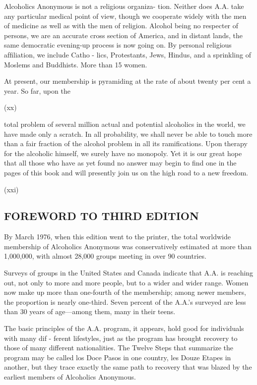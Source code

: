 Alcoholics Anonymous is not a religious organiza-
tion. Neither does A.A. take any particular medical
point of view, though we cooperate widely with the
men of medicine as well as with the men of religion.
Alcohol being no respecter of persons, we are an
accurate cross section of America, and in distant lands,
the same democratic evening-up process is now going
on. By personal religious afﬁliation, we include Catho -
lics, Protestants, Jews, Hindus, and a sprinkling of
Moslems and Buddhists. More than 15%
women.

At present, our membership is pyramiding at the
rate of about twenty per cent a year. So far, upon the

\metapage(xx)

total problem of several million actual and potential
 alcoholics in the world, we have made only a scratch.
In all probability, we shall never be able to touch more
than a fair fraction of the alcohol problem in all its
 ramiﬁcations. Upon therapy for the alcoholic himself,
we surely have no monopoly. Yet it is our great hope
that all those who have as yet found no answer may
begin to ﬁnd one in the pages of this book and will
presently join us on the high road to a new freedom.

\metapage(xxi)


\subsection{FOREWORD TO THIRD EDITION}

By March 1976, when this edition went to the
printer, the total worldwide membership of
Alcoholics Anonymous was conservatively estimated at
more than 1,000,000, with almost 28,000 groups
meeting in over 90 countries.

Surveys of groups in the United States and Canada
indicate that A.A. is reaching out, not only to more
and more people, but to a wider and wider range.
Women now make up more than one-fourth of the
membership; among newer members, the proportion
is nearly one-third. Seven percent of the A.A.’s
surveyed are less than 30 years of age—among them,
many in their teens.

The basic principles of the A.A. program, it appears,
hold  good  for  individuals  with  many  dif -
ferent lifestyles, just as the program has brought
recovery to those of many different nationalities. The
Twelve Steps that summarize the program may be
called los Doce Pasos in one country, les Douze Etapes
in another, but they trace exactly the same path to
recovery that was blazed by the earliest members of
Alcoholics Anonymous.


